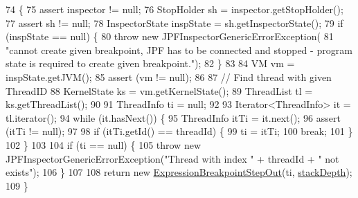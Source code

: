 \begin{DoxyCode}
74                                                                                                            
                                                          \{
75     assert inspector != null;
76     StopHolder sh = inspector.getStopHolder();
77     assert sh != null;
78     InspectorState inspState = sh.getInspectorState();
79     \textcolor{keywordflow}{if} (inspState == null) \{
80       \textcolor{keywordflow}{throw} \textcolor{keyword}{new} JPFInspectorGenericErrorException(
81           \textcolor{stringliteral}{"cannot create given breakpoint, JPF has to be connected and stopped - program state is required
       to create given breakpoint."});
82     \}
83 
84     VM vm = inspState.getJVM();
85     assert (vm != null);
86 
87     \textcolor{comment}{// Find thread with given ThreadID}
88     KernelState ks = vm.getKernelState();
89     ThreadList tl = ks.getThreadList();
90 
91     ThreadInfo ti = null;
92 
93     Iterator<ThreadInfo> it = tl.iterator();
94     \textcolor{keywordflow}{while} (it.hasNext()) \{
95       ThreadInfo itTi = it.next();
96       assert (itTi != null);
97 
98       \textcolor{keywordflow}{if} (itTi.getId() == threadId) \{
99         ti = itTi;
100         \textcolor{keywordflow}{break};
101       \}
102     \}
103 
104     \textcolor{keywordflow}{if} (ti == null) \{
105       \textcolor{keywordflow}{throw} \textcolor{keyword}{new} JPFInspectorGenericErrorException(\textcolor{stringliteral}{"Thread with index "} + threadId + \textcolor{stringliteral}{" not exists"});
106     \}
107 
108     \textcolor{keywordflow}{return} \textcolor{keyword}{new} \hyperlink{classgov_1_1nasa_1_1jpf_1_1inspector_1_1server_1_1expression_1_1expressions_1_1_expression_breakpoint_step_out_a0dafcee5f8664d34996f6b4aadef84c8}{ExpressionBreakpointStepOut}(ti, 
      \hyperlink{classgov_1_1nasa_1_1jpf_1_1inspector_1_1server_1_1expression_1_1expressions_1_1_expression_breakpoint_step_out_a1bee35b7dd22e687b0e2f3a0c2a3402d}{stackDepth});
109   \}
\end{DoxyCode}

